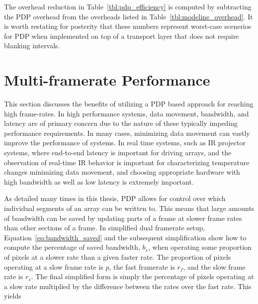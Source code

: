     The overhead reduction in Table~\ref{tbl:pdp_efficiency} is computed by subtracting the PDP overhead from the overheads listed in Table~\ref{tbl:modeline_overhead}. It is worth restating for posterity that these numbers represent worst-case scenerios for PDP when implemented on top of a transport layer that does not require blanking intervals.

\section{Multi-framerate Performance}
    \label{sec:multi_framerate_performance}

    This section discusses the benefits of utilizing a PDP based approach for reaching high frame-rates. In high performance systems, data movement\cite{LeeEtAl1984}, bandwidth\cite{LaiBaker1999}, and latency\cite{ZhengEtAl2014} are of primary concern due to the nature of these typically impeding performance requirements. In many cases, minimizing data movement can vastly improve the performance of systems\cite{BandyopadhyayCoyle2004,LiEtAl2009,Hall2020}. In real time systems\cite{kopetz2011real}, such as IR projector systems, where end-to-end latency is important for driving arrays, and the observation of real-time IR behavior is important for characterizing temperature changes\cite{ZhouEtAl2000} minimizing data movement, and choosing appropriate hardware with high bandwidth as well as low latency is extremely important.

    As detailed many times in this thesis, PDP allows for control over which individual segments of an array can be written to. This means that large amounts of bandwidth can be saved by updating parts of a frame at slower frame rates than other sections of a frame. In simplified dual framerate setup, Equation~\eqref{eq:bandwidth_saved} and the subsequent simplification show how to compute the percentage of saved bandwidth, $b_s$, when operating some proportion of pixels at a slower rate than a given faster rate. The proportion of pixels operating at a slow frame rate is $p$, the fast framerate is $r_f$, and the slow frame rate is $r_s$. The final simplified form is simply the percentage of pixels operating at a slow rate multiplied by the difference between the rates over the fast rate. This yields

